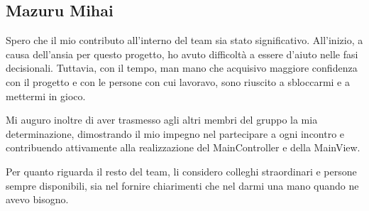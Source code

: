 \documentclass[a4paper,12pt]{report}
\begin{document}
\subsection{Mazuru Mihai}
Spero che il mio contributo all'interno del team sia stato significativo. All'inizio, a causa dell'ansia per questo progetto, ho avuto difficoltà a essere d'aiuto nelle fasi decisionali. Tuttavia, con il tempo, man mano che acquisivo maggiore confidenza con il progetto e con le persone con cui lavoravo, sono riuscito a sbloccarmi e a mettermi in gioco.

Mi auguro inoltre di aver trasmesso agli altri membri del gruppo la mia determinazione, dimostrando il mio impegno nel partecipare a ogni incontro e contribuendo attivamente alla realizzazione del MainController e della MainView.

Per quanto riguarda il resto del team, li considero colleghi straordinari e persone sempre disponibili, sia nel fornire chiarimenti che nel darmi una mano quando ne avevo bisogno.
\end{document}
